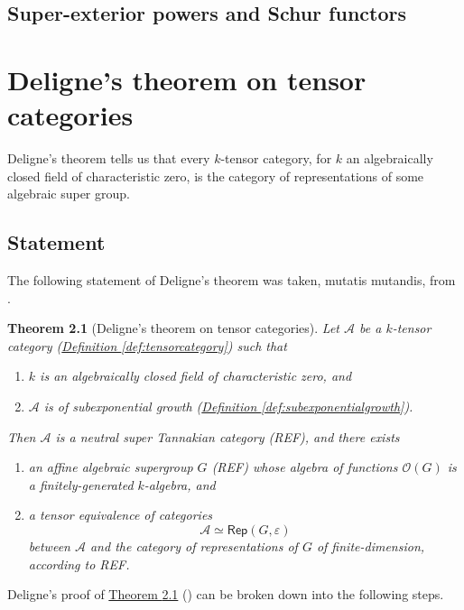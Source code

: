 \documentclass[a4paper,10pt]{scrreprt}
\theoremstyle{definition}
\theoremstyle{plain}
\newtheorem{theorem}{Theorem}[section]
\theoremstyle{remark}
\begin{document}
\section{Super-exterior powers and Schur functors}

\chapter{Deligne's theorem on tensor categories}
Deligne's theorem tells us that every $k$-tensor category, for $k$ an algebraically closed field of characteristic zero, is the category of representations of some algebraic super group.

\section{Statement}

The following statement of Deligne's theorem was taken, mutatis mutandis, from \cite{nlab-deligne-theorem}.

\begin{theorem}[Deligne's theorem on tensor categories]
  \label{thm:delignestheorem}
  Let $\mathscr{A}$ be a $k$-tensor category (\hyperref[def:tensorcategory]{Definition \ref*{def:tensorcategory}}) such that
  \begin{enumerate}
    \item $k$ is an algebraically closed field of characteristic zero, and

    \item $\mathscr{A}$ is of subexponential growth (\hyperref[def:subexponentialgrowth]{Definition \ref*{def:subexponentialgrowth}}).
  \end{enumerate}

  Then $\mathscr{A}$ is a neutral super Tannakian category (REF), and there exists 
  \begin{enumerate}
    \item an affine algebraic supergroup $G$ (REF) whose algebra of functions $\mathscr{O}(G)$ is a finitely-generated $k$-algebra, and 

    \item a tensor equivalence of categories
      \begin{equation*}
        \mathscr{A} \simeq \mathsf{Rep}(G, \varepsilon)
      \end{equation*}
      between $\mathscr{A}$ and the category of representations of $G$ of finite-dimension, according to REF.
  \end{enumerate}
\end{theorem}
Deligne's proof of \hyperref[thm:delignestheorem]{Theorem \ref*{thm:delignestheorem}} (\cite{deligne-categories-tensorielle}) can be broken down into the following steps.
\end{document}
